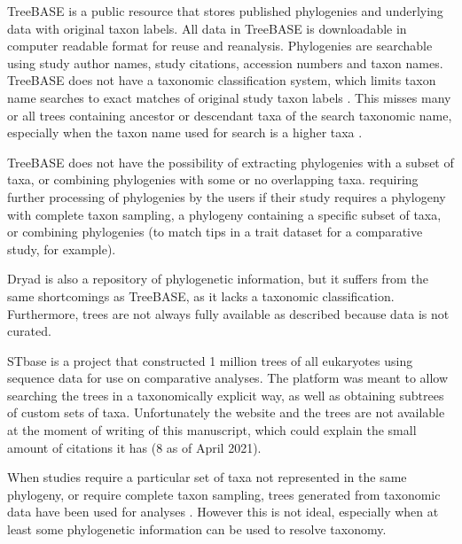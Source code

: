 \documentclass[oupdraft]{sysbio_sse}
\begin{document}
TreeBASE \citep{piel2000treebase} is a public resource that stores published
phylogenies and underlying data with original taxon labels.
All data in TreeBASE is downloadable in computer readable format for reuse and reanalysis.
Phylogenies are searchable using study author names, study citations, accession numbers and taxon names.
TreeBASE does not have a taxonomic classification system, which limits
taxon name searches to exact matches of original study taxon labels \citep{anwar2009improved}.
This misses many or all trees containing ancestor or descendant taxa of the search taxonomic
name, especially when the taxon name used for search is a higher taxa \citep{chen2008phylofinder}.


TreeBASE does not have the possibility of extracting phylogenies with a
subset of taxa, or combining phylogenies with some or no overlapping taxa.
requiring further processing of phylogenies by the users if their study requires a phylogeny
with complete taxon sampling, a phylogeny containing a specific subset of taxa,
 or combining phylogenies (to match tips in a trait dataset for a comparative study, for example).

Dryad is also a repository of phylogenetic information, but it suffers from
the same shortcomings as TreeBASE, as it lacks a taxonomic classification.
Furthermore, trees are not always fully available as described because data is not curated.

STbase \citep{mcmahon2015stbase} is a project that constructed 1 million trees of
all eukaryotes using sequence data for use on comparative analyses.
The platform was meant to allow searching the
trees in a taxonomically explicit way, as well as obtaining subtrees of custom sets of taxa.
Unfortunately the website and the trees are not available at the moment of writing of
this manuscript, which could explain the small amount of citations it has (8 as of April 2021).

When studies require a particular set of taxa not represented in the same phylogeny,
or require complete taxon sampling, trees generated from taxonomic data have been
used for analyses \citep{tree2014tree}.
 However this is not ideal, especially when at least some phylogenetic information
 can be used to resolve taxonomy.
\end{document}
